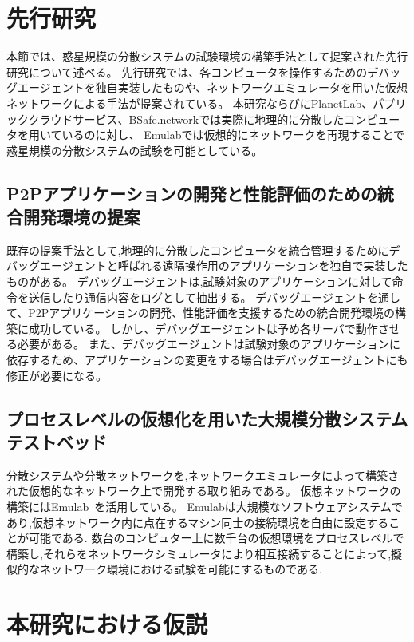 \section{先行研究}
\label{issue:previous-research}

本節では、惑星規模の分散システムの試験環境の構築手法として提案された先行研究について述べる。
先行研究では、各コンピュータを操作するためのデバッグエージェントを独自実装したものや、ネットワークエミュレータを用いた仮想ネットワークによる手法が提案されている。
本研究ならびにPlanetLab、パブリッククラウドサービス、BSafe.networkでは実際に地理的に分散したコンピュータを用いているのに対し、
Emulabでは仮想的にネットワークを再現することで惑星規模の分散システムの試験を可能としている。

\subsection{P2Pアプリケーションの開発と性能評価のための統合開発環境の提案}

既存の提案手法として,地理的に分散したコンピュータを統合管理するためにデバッグエージェントと呼ばれる遠隔操作用のアプリケーションを独自で実装したものがある。
デバッグエージェントは,試験対象のアプリケーションに対して命令を送信したり通信内容をログとして抽出する。
デバッグエージェントを通して、P2Pアプリケーションの開発、性能評価を支援するための統合開発環境の構築に成功している。
しかし、デバッグエージェントは予め各サーバで動作させる必要がある。
また、デバッグエージェントは試験対象のアプリケーションに依存するため、アプリケーションの変更をする場合はデバッグエージェントにも修正が必要になる。

\subsection{プロセスレベルの仮想化を用いた大規模分散システムテストベッド}
\label{consideration:related-works:emulab}

分散システムや分散ネットワークを,ネットワークエミュレータによって構築された仮想的なネットワーク上で開発する取り組みである。
仮想ネットワークの構築にはEmulab~\cite{Emulab}を活用している。
Emulabは大規模なソフトウェアシステムであり,仮想ネットワーク内に点在するマシン同士の接続環境を自由に設定することが可能である.
数台のコンピュター上に数千台の仮想環境をプロセスレベルで構築し,それらをネットワークシミュレータにより相互接続することによって,擬似的なネットワーク環境における試験を可能にするものである.

\section{本研究における仮説}
\label{issue:hypothesis}

